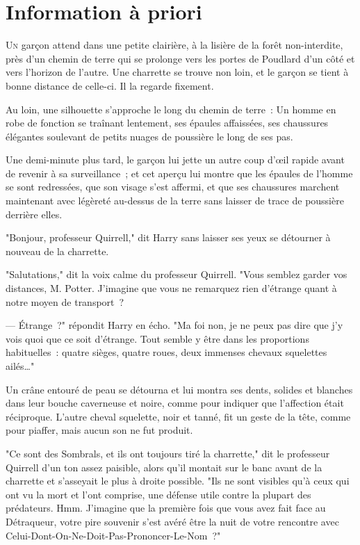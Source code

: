 \chapter{Information à priori}

\lettrine{U}{n} garçon attend dans une petite clairière, à la lisière de la forêt non-interdite, près d'un chemin de terre qui se prolonge vers les portes de Poudlard d'un côté et vers l'horizon de l'autre. Une charrette se trouve non loin, et le garçon se tient à bonne distance de celle-ci. Il la regarde fixement.

Au loin, une silhouette s'approche le long du chemin de terre~: Un homme en robe de fonction se traînant lentement, ses épaules affaissées, ses chaussures élégantes soulevant de petits nuages de poussière le long de ses pas.

Une demi-minute plus tard, le garçon lui jette un autre coup d'œil rapide avant de revenir à sa surveillance~; et cet aperçu lui montre que les épaules de l'homme se sont redressées, que son visage s'est affermi, et que ses chaussures marchent maintenant avec légèreté au-dessus de la terre sans laisser de trace de poussière derrière elles.

"Bonjour, professeur Quirrell," dit Harry sans laisser ses yeux se détourner à nouveau de la charrette.

"Salutations," dit la voix calme du professeur Quirrell. "Vous semblez garder vos distances, M. Potter. J'imagine que vous ne remarquez rien d'étrange quant à notre moyen de transport~?

--- Étrange~?" répondit Harry en écho. "Ma foi non, je ne peux pas dire que j'y vois quoi que ce soit d'étrange. Tout semble y être dans les proportions habituelles~: quatre sièges, quatre roues, deux immenses chevaux squelettes ailés…"

Un crâne entouré de peau se détourna et lui montra ses dents, solides et blanches dans leur bouche caverneuse et noire, comme pour indiquer que l'affection était réciproque. L'autre cheval squelette, noir et tanné, fit un geste de la tête, comme pour piaffer, mais aucun son ne fut produit.

"Ce sont des Sombrals, et ils ont toujours tiré la charrette," dit le professeur Quirrell d'un ton assez paisible, alors qu'il montait sur le banc avant de la charrette et s'asseyait le plus à droite possible. "Ils ne sont visibles qu'à ceux qui ont vu la mort et l'ont comprise, une défense utile contre la plupart des prédateurs. Hmm. J'imagine que la première fois que vous avez fait face au Détraqueur, votre pire souvenir s'est avéré être la nuit de votre rencontre avec Celui-Dont-On-Ne-Doit-Pas-Prononcer-Le-Nom~?"

